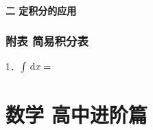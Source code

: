 \documentclass[
]{article}
\begin{document}
\hypertarget{ux4e8c--ux5b9aux79efux5206ux7684ux5e94ux7528}{%
\paragraph{二
定积分的应用}\label{ux4e8c--ux5b9aux79efux5206ux7684ux5e94ux7528}}

\hypertarget{ux9644ux8868--ux7b80ux6613ux79efux5206ux8868}{%
\subsubsection{附表
简易积分表}\label{ux9644ux8868--ux7b80ux6613ux79efux5206ux8868}}

1．\(\int \, {\rm d}x= \)

\hypertarget{ux6570ux5b66-ux9ad8ux4e2dux8fdbux9636ux7bc7}{%
\section{数学
高中进阶篇}\label{ux6570ux5b66-ux9ad8ux4e2dux8fdbux9636ux7bc7}}
\end{document}
